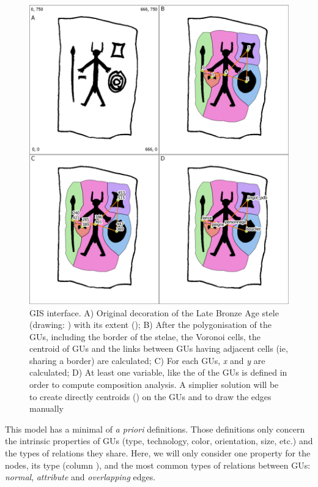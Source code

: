 \documentclass[article]{jss}\usepackage{knitr}
\begin{document}
\begin{figure}[H]
\centering
\includegraphics{gis}
\caption{\label{fig:gis} GIS interface. A) Original decoration of the Late Bronze Age  stele (drawing: \cite{DiazGuardamino10}) with its extent (); B) After the polygonisation of the GUs, including the border of the stelae, the Voronoi cells, the centroid of GUs and the links between GUs having adjacent cells (ie, sharing a border) are calculated; C) For each GUs, \emph{x} and \emph{y} are calculated; D) At least one variable, like the  of the GUs is defined in order to compute composition analysis. A simplier solution will be to create directly centroids () on the GUs and to draw the edges manually}
\end{figure}

This model has a minimal of \emph{a priori} definitions. Those definitions only concern the intrinsic properties of GUs (type, technology, color, orientation, size, etc.) and the types of relations they share. Here, we will only consider one property for the nodes, its type (column ), and the most common types of relations between GUs: \emph{normal}, \emph{attribute} and \emph{overlapping} edges.
\end{document}
